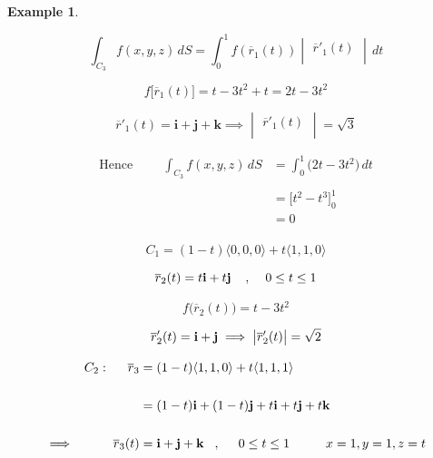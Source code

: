 \documentclass[11pt,a4paper]{article}
\theoremstyle{definition}
\newtheorem{exa}[thm]{Example}
\begin{document}
\begin{exa}
\begin{enumerate}
$$\int_{C_3} f(x,y,z)\, dS = \int^1_0f(\overline{r}_1(t))\begin{vmatrix}
\overline{r}'_1(t)\\
\end{vmatrix}\,dt
$$

$$f\big[\overline{r}_1(t)\big]= t - 3t^2 + t = 2t - 3t^2$$

$$\overline{r}'_1(t) = \textbf{i} + \textbf{j} + \textbf{k}\implies \begin{vmatrix}
\overline{r}'_1(t)\\
\end{vmatrix}=\sqrt{3}
$$

\begin{align*}
\text{Hence}\hspace{1cm} \int_{C_3} f(x,y,z)\,dS & = \int^1_0 \big(2t-3t^2\big)\,dt\\\\
& = \Big[t^2-t^3\Big]^1_0\\
& = 0\\
\end{align*}

$$C_1 = (1-t)\langle 0,0,0\rangle + t\langle 1,1,0\rangle$$

$$\overline{r}_2(t) = t\textbf{i} + t\textbf{j}\hspace{0.4cm}, \hspace{0.4cm} 0\leq t \leq 1$$

$$f\big(\overline{r}_2(t)\big) = t - 3t^2$$

$$\overline{r}_2'(t) = \textbf{i} + \textbf{j} \implies \begin{vmatrix}
\overline{r}'_2(t)\\
\end{vmatrix}= \sqrt{2}\\
$$

\begin{align*}
C_2 : \hspace{0.5cm} \overline{r}_3 & = (1-t)\langle 1,1,0\rangle + t\langle 1,1,1\rangle\\\\
& = (1-t)\textbf{i} + (1-t)\textbf{j} + t\textbf{i}  + t\textbf{j} + t\textbf{k}\\\\
\implies\hspace{1cm} \overline{r}_3(t) & = \textbf{i} + \textbf{j} + \textbf{k}\hspace{0.3cm} ,\hspace{0.5cm} 0\leq t\leq 1\hspace{1cm} x=1, y=1, z =t
\end{align*}


\end{enumerate}
\end{exa}
\end{document}
